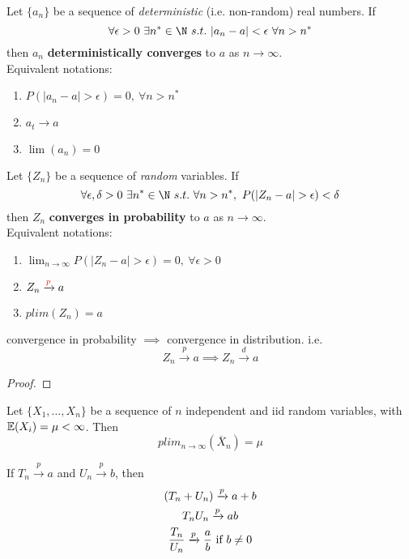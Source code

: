 \documentclass[]{article}
\begin{document}
		\begin{definition}
			Let $\{a_n\}$ be a sequence of \emph{deterministic} (i.e. non-random) real numbers. If 
			\[
				\forall \epsilon > 0\ \exists n^* \in \N \ s.t.\ |a_n - a| < \epsilon\ \forall n > n^*
			\]
			then $a_n$ \textbf{deterministically converges} to $a$ as $n \to \infty$. \\
			Equivalent notations:
			\begin{enumerate}
				\item $P(|a_n - a|>\epsilon) = 0,\ \forall n > n^*$
				\item $a_t \to a$
				\item $\lim(a_n) = 0$
			\end{enumerate}
		\end{definition}
		
		\begin{definition}
			Let $\{Z_n\}$ be a sequence of \emph{random} variables. If 
			\[
				\forall \epsilon, \delta > 0\ \exists n^* \in \N\ s.t.\ \forall n > n^*,\ P(|Z_n - a |>\epsilon) < \delta
			\]
			then $Z_n$ \textbf{converges in probability} to $a$ as $n \to \infty$. \\
			Equivalent notations:
			\begin{enumerate}
				\item $\lim_{n \to \infty} P(|Z_n - a| > \epsilon) = 0,\ \forall \epsilon > 0$
				\item $Z_n \xrightarrow{\textcolor{red}{p}}a$
				\item $plim(Z_n) = a$
			\end{enumerate}
		\end{definition}
		
		\begin{theorem}
			convergence in probability $\implies$ convergence in distribution. i.e.
			\[
				Z_n \xrightarrow{p} a \implies Z_n \xrightarrow{d} a
			\]
		\end{theorem}
		\begin{proof}
			
		\end{proof}
		
		\begin{theorem}
			Let $\{X_1, \dots, X_n\}$ be a sequence of $n$ independent and iid random variables, with $\mathbb{E}({X_i}) = \mu < \infty$. Then
			\[
				plim_{n \to \infty}(\overline{X}_n) = \mu
			\]
		\end{theorem}
		
		\begin{theorem}
			If $T_n \xrightarrow{p} a$ and $U_n \xrightarrow{p} b$, then
				\begin{gather*}
					(T_n + U_n) \xrightarrow{p} a + b \\
					T_n U_n \xrightarrow{p} ab \\
					\frac{T_n}{U_n} \xrightarrow{p} \frac{a}{b} \text{{ if }} b \neq 0
				\end{gather*}
		\end{theorem}
		
\end{document}
